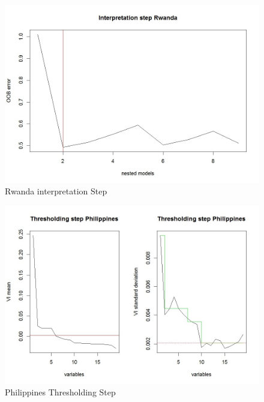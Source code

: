 \documentclass[11pt]{article}
\begin{document}
\FloatBarrier
\begin{figure}[!htb]
\begin{center}
\includegraphics[scale=0.55]{F4.jpg}
\caption{Rwanda interpretation Step}
\label{figure15}
\end{center}
\end{figure}
\FloatBarrier

\FloatBarrier
\begin{figure}[!htb]
\begin{center}
\includegraphics[scale=0.55]{F5.jpg}
\caption{Philippines Thresholding Step}
\label{figure16}
\end{center}
\end{figure}
\FloatBarrier
\end{document}
